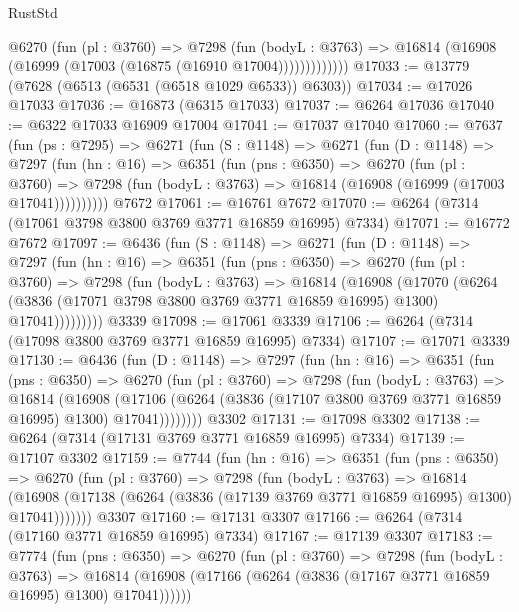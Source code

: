 \begin{lexlean}{RustStd}
\begin{coremodule}
              @6270
                (fun (pl : @3760) =>
                @7298
                  (fun (bodyL : @3763) =>
                  @16814 (@16908 (@16999 (@17003 (@16875 (@16910 @17004)))))))))))))
@17033 := @13779 (@7628 (@6513 (@6531 (@6518 @1029 @6533)) @6303))
@17034 := @17026 @17033
@17036 := @16873 (@6315 @17033)
@17037 := @6264 @17036
@17040 := @6322 @17033 @16909 @17004
@17041 := @17037 @17040
@17060 := @7637
    (fun (ps : @7295) =>
    @6271
      (fun (S : @1148) =>
      @6271
        (fun (D : @1148) =>
        @7297
          (fun (hn : @16) =>
          @6351
            (fun (pns : @6350) =>
            @6270
              (fun (pl : @3760) =>
              @7298 (fun (bodyL : @3763) => @16814 (@16908 (@16999 (@17003 @17041))))))))))
    @7672
@17061 := @16761 @7672
@17070 := @6264 (@7314 (@17061 @3798 @3800 @3769 @3771 @16859 @16995) @7334)
@17071 := @16772 @7672
@17097 := @6436
    (fun (S : @1148) =>
    @6271
      (fun (D : @1148) =>
      @7297
        (fun (hn : @16) =>
        @6351
          (fun (pns : @6350) =>
          @6270
            (fun (pl : @3760) =>
            @7298
              (fun (bodyL : @3763) =>
              @16814
                (@16908
                  (@17070
                    (@6264
                      (@3836 (@17071 @3798 @3800 @3769 @3771 @16859 @16995) @1300)
                      @17041)))))))))
    @3339
@17098 := @17061 @3339
@17106 := @6264 (@7314 (@17098 @3800 @3769 @3771 @16859 @16995) @7334)
@17107 := @17071 @3339
@17130 := @6436
    (fun (D : @1148) =>
    @7297
      (fun (hn : @16) =>
      @6351
        (fun (pns : @6350) =>
        @6270
          (fun (pl : @3760) =>
          @7298
            (fun (bodyL : @3763) =>
            @16814
              (@16908
                (@17106 (@6264 (@3836 (@17107 @3800 @3769 @3771 @16859 @16995) @1300) @17041))))))))
    @3302
@17131 := @17098 @3302
@17138 := @6264 (@7314 (@17131 @3769 @3771 @16859 @16995) @7334)
@17139 := @17107 @3302
@17159 := @7744
    (fun (hn : @16) =>
    @6351
      (fun (pns : @6350) =>
      @6270
        (fun (pl : @3760) =>
        @7298
          (fun (bodyL : @3763) =>
          @16814
            (@16908 (@17138 (@6264 (@3836 (@17139 @3769 @3771 @16859 @16995) @1300) @17041)))))))
    @3307
@17160 := @17131 @3307
@17166 := @6264 (@7314 (@17160 @3771 @16859 @16995) @7334)
@17167 := @17139 @3307
@17183 := @7774
    (fun (pns : @6350) =>
    @6270
      (fun (pl : @3760) =>
      @7298
        (fun (bodyL : @3763) =>
        @16814 (@16908 (@17166 (@6264 (@3836 (@17167 @3771 @16859 @16995) @1300) @17041))))))

\end{coremodule}
\end{lexlean}
